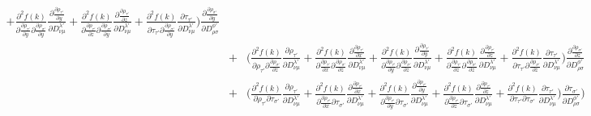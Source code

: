 \documentclass[preprint,preprintnumbers,amsmath,amssymb,11pt]{revtex4}
\begin{document}
\begin{eqnarray}
+ \frac{\partial^{2} f(k)}{\partial \frac{\partial \rho_{\tau'}}{\partial y} \partial \frac{\partial \rho_{\sigma'}}{\partial y}} \frac{\partial \frac{\partial \rho_{\tau'}}{\partial y}}{\partial D^{\lambda'}_{\nu \mu}}+ \frac{\partial^{2} f(k)}{\partial \frac{\partial \rho_{\tau'}}{\partial z} \partial \frac{\partial \rho_{\sigma'}}{\partial y}} \frac{\partial \frac{\partial \rho_{\tau'}}{\partial z}}{\partial D^{\lambda'}_{\nu \mu}}+ \frac{\partial^{2} f(k)}{\partial \tau_{\tau'} \partial \frac{\partial \rho_{\sigma'}}{\partial y}} \frac{\partial \tau_{\tau'} }{\partial D^{\lambda'}_{\nu \mu}}\biggr) \frac{\partial \frac{\partial \rho_{\sigma'}}{\partial y}}{\partial D^{\phi'}_{\rho \sigma}}\nonumber\\
&+&\biggl( \frac{\partial^{2} f(k)}{\partial \rho_{\tau'} \partial \frac{\partial \rho_{\sigma'}}{\partial z}} \frac{\partial \rho_{\tau'}}{\partial D^{\lambda'}_{\nu \mu}} 
+ \frac{\partial^{2} f(k)}{\partial \frac{\partial \rho_{\tau'}}{\partial x} \partial \frac{\partial \rho_{\sigma'}}{\partial z}} \frac{\partial \frac{\partial \rho_{\tau'}}{\partial x}}{\partial D^{\lambda'}_{\nu \mu}}
+ \frac{\partial^{2} f(k)}{\partial \frac{\partial \rho_{\tau'}}{\partial y} \partial \frac{\partial \rho_{\sigma'}}{\partial z}} \frac{\partial \frac{\partial \rho_{\tau'}}{\partial y}}{\partial D^{\lambda'}_{\nu \mu}}+ \frac{\partial^{2} f(k)}{\partial \frac{\partial \rho_{\tau'}}{\partial z} \partial \frac{\partial \rho_{\sigma'}}{\partial z}} \frac{\partial \frac{\partial \rho_{\tau'}}{\partial z}}{\partial D^{\lambda'}_{\nu \mu}}+ \frac{\partial^{2} f(k)}{\partial \tau_{\tau'} \partial \frac{\partial \rho_{\sigma'}}{\partial z}} \frac{\partial \tau_{\tau'} }{\partial D^{\lambda'}_{\nu \mu}}\biggr) \frac{\partial \frac{\partial \rho_{\sigma'}}{\partial z}}{\partial D^{\phi'}_{\rho \sigma}} \nonumber\\
&+&
\biggl( \frac{\partial^{2} f(k)}{\partial \rho_{\tau'} \partial \tau_{\sigma'}} \frac{\partial \rho_{\tau'}}{\partial D^{\lambda'}_{\nu \mu}} 
+ \frac{\partial^{2} f(k)}{\partial \frac{\partial \rho_{\tau'}}{\partial x} \partial \tau_{\sigma'}} \frac{\partial \frac{\partial \rho_{\tau'}}{\partial x}}{\partial D^{\lambda'}_{\nu \mu}}
+ \frac{\partial^{2} f(k)}{\partial \frac{\partial \rho_{\tau'}}{\partial y} \partial \tau_{\sigma'}} \frac{\partial \frac{\partial \rho_{\tau'}}{\partial y}}{\partial D^{\lambda'}_{\nu \mu}}+ \frac{\partial^{2} f(k)}{\partial \frac{\partial \rho_{\tau'}}{\partial z} \partial \tau_{\sigma'}} \frac{\partial \frac{\partial \rho_{\tau'}}{\partial z}}{\partial D^{\lambda'}_{\nu \mu}} + \frac{\partial^{2} f(k)}{\partial \tau_{\tau'} \partial \tau_{\sigma'}} \frac{\partial \tau_{\tau'}}{\partial D^{\lambda'}_{\nu \mu}}\biggr) \frac{\partial \tau_{\sigma'}}{\partial D^{\phi'}_{\rho \sigma}} \biggr)\nonumber
\end{eqnarray}
\end{document}
